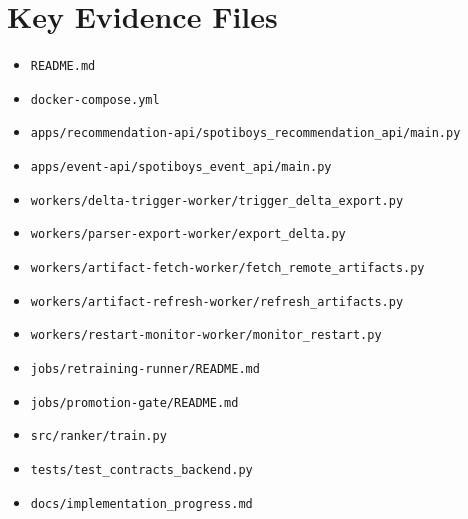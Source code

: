 \documentclass[11pt,a4paper]{article}
\begin{document}
\section{Key Evidence Files}

\begin{itemize}
  \item \texttt{README.md}
  \item \texttt{docker-compose.yml}
  \item \texttt{apps/recommendation-api/spotiboys\_recommendation\_api/main.py}
  \item \texttt{apps/event-api/spotiboys\_event\_api/main.py}
  \item \texttt{workers/delta-trigger-worker/trigger\_delta\_export.py}
  \item \texttt{workers/parser-export-worker/export\_delta.py}
  \item \texttt{workers/artifact-fetch-worker/fetch\_remote\_artifacts.py}
  \item \texttt{workers/artifact-refresh-worker/refresh\_artifacts.py}
  \item \texttt{workers/restart-monitor-worker/monitor\_restart.py}
  \item \texttt{jobs/retraining-runner/README.md}
  \item \texttt{jobs/promotion-gate/README.md}
  \item \texttt{src/ranker/train.py}
  \item \texttt{tests/test\_contracts\_backend.py}
  \item \texttt{docs/implementation\_progress.md}
\end{itemize}
\end{document}
